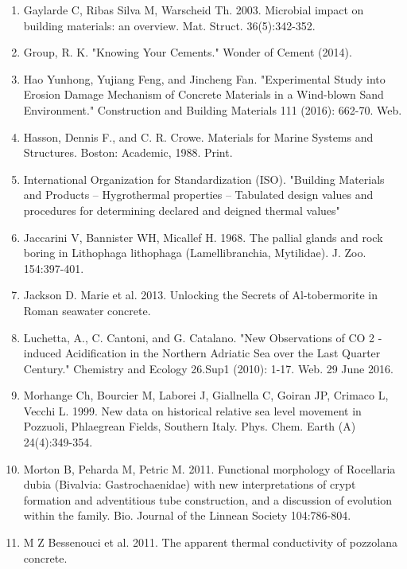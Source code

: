 \documentclass[12pt]{article}
\begin{document}
\begin{enumerate}
\item Gaylarde C, Ribas Silva M, Warscheid Th. 2003. Microbial impact on building materials: an overview. Mat. Struct. 36(5):342-352.

\item Group, R. K. "Knowing Your Cements." Wonder of Cement (2014). 

\item Hao Yunhong, Yujiang Feng, and Jincheng Fan. "Experimental Study into Erosion Damage Mechanism of Concrete 
Materials in a Wind-blown Sand Environment." Construction and Building Materials 111 (2016): 662-70. Web.

\item Hasson, Dennis F., and C. R. Crowe. Materials for Marine Systems and Structures. Boston: Academic, 1988. Print.

\item International Organization for Standardization (ISO). "Building Materials and Products -- Hygrothermal properties -- Tabulated design values and procedures for determining declared and deigned thermal values"

\item Jaccarini V, Bannister WH, Micallef H. 1968. The pallial glands and rock boring in Lithophaga lithophaga (Lamellibranchia, Mytilidae). J. Zoo. 154:397-401.

\item Jackson D. Marie et al. 2013. Unlocking the Secrets of Al-tobermorite in Roman seawater concrete. 

\item Luchetta, A., C. Cantoni, and G. Catalano. "New Observations of CO 2 -induced Acidification in the Northern Adriatic Sea 
over the Last Quarter Century." Chemistry and Ecology 26.Sup1 (2010): 1-17. Web. 29 June 2016.

\item Morhange Ch, Bourcier M, Laborei J, Giallnella C, Goiran JP, Crimaco L, Vecchi L. 1999. New data on historical relative sea level movement in Pozzuoli, Phlaegrean Fields, Southern Italy. Phys. Chem. Earth (A) 24(4):349-354.

\item Morton B, Peharda M, Petric M. 2011. Functional morphology of Rocellaria dubia (Bivalvia: Gastrochaenidae) with new interpretations of crypt formation and adventitious tube construction, and a discussion of evolution within the family. Bio. Journal of the Linnean Society 104:786-804.

\item M Z Bessenouci et al. 2011. The apparent thermal conductivity of pozzolana concrete. 


\end{enumerate}
\end{document}
